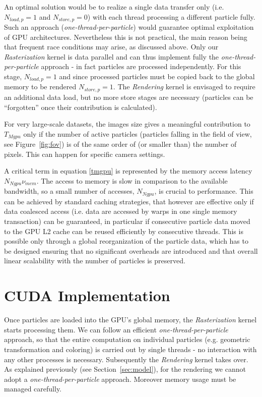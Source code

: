 \documentclass[1p]{elsarticle}
\begin{document}
An optimal solution would be to realize a single data transfer only
(i.e. $N_{load,p} = 1$ and $N_{store,p} = 0$) with each thread processing a different particle fully. Such an approach ({\it one-thread-per-particle}) would guarantee optimal exploitation of GPU architectures. Nevertheless this is not practical, the main reason being that frequent race conditions may arise, 
as discussed above.
Only our {\it Rasterization} kernel is data parallel and can thus implement fully the {\it one-thread-per-particle} approach - in fact particles are processed independently. For this stage, $N_{load,p} = 1$ and since processed particles must be copied back to the global memory to be rendered $N_{store,p} = 1$. The {\it Rendering} kernel is envisaged to require an additional data load, but no more store 
stages are necessary (particles can be ``forgotten'' once their contribution is calculated).

For very large-scale datasets, the images size gives a meaningful contribution to $T_{Mgpu}$ only if the number of active particles (particles falling in the field of view, see Figure~\ref{fig:fov}) is of the same order of (or smaller than) the number of pixels. This can happen for specific camera settings.

A critical term in equation \eqref{tmgpu} is represented by the memory access
latency $N_{Ngpu} \nu_{mem}$. The access to memory is slow in comparison to
the available bandwidth, so a small number of accesses, $N_{Ngpu}$, is crucial
to performance. This can be achieved by standard caching strategies, that
however are effective only if data coalesced access (i.e. data are accessed by warps in one single memory transaction) can be guaranteed, in particular if consecutive particle data moved to the GPU L2 cache can be reused efficiently by consecutive threads. This is possible only through a global reorganization of the particle data, which has to be designed ensuring that no significant overheads are introduced and that overall linear scalability with the number of particles is preserved.

\section{CUDA Implementation}
\label{sec:implementation}

Once particles are loaded into the GPU's global memory, the {\it Rasterization} kernel starts processing them. We can follow an efficient {\it one-thread-per-particle} approach, so that the entire computation on individual particles (e.g. geometric transformation and coloring) is carried out by single threads - no interaction with any other processes is necessary. 
Subsequently the {\it Rendering} kernel takes over. As explained previously (see Section~\ref{sec:model}), for the rendering we cannot adopt a {\it one-thread-per-particle} approach. Moreover memory usage must be managed carefully.
\end{document}
